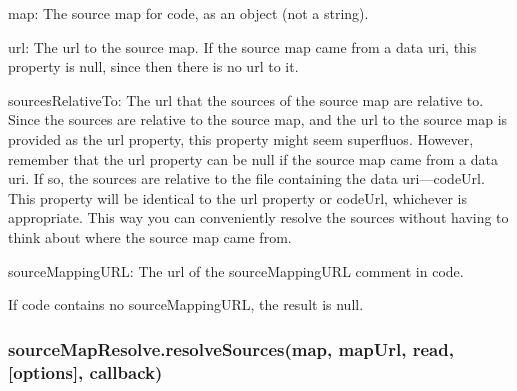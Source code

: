 \begin{DoxyItemize}
\item {\ttfamily map}\+: The source map for {\ttfamily code}, as an object (not a string).
\item {\ttfamily url}\+: The url to the source map. If the source map came from a data uri, this property is {\ttfamily null}, since then there is no url to it.
\item {\ttfamily sources\+Relative\+To}\+: The url that the sources of the source map are relative to. Since the sources are relative to the source map, and the url to the source map is provided as the {\ttfamily url} property, this property might seem superfluos. However, remember that the {\ttfamily url} property can be {\ttfamily null} if the source map came from a data uri. If so, the sources are relative to the file containing the data uri—{\ttfamily code\+Url}. This property will be identical to the {\ttfamily url} property or {\ttfamily code\+Url}, whichever is appropriate. This way you can conveniently resolve the sources without having to think about where the source map came from.
\item {\ttfamily source\+Mapping\+U\+RL}\+: The url of the source\+Mapping\+U\+RL comment in {\ttfamily code}.
\end{DoxyItemize}

If {\ttfamily code} contains no source\+Mapping\+U\+RL, the result is {\ttfamily null}.

\subsubsection*{{\ttfamily source\+Map\+Resolve.\+resolve\+Sources(map, map\+Url, read, \mbox{[}options\mbox{]}, callback)}}


